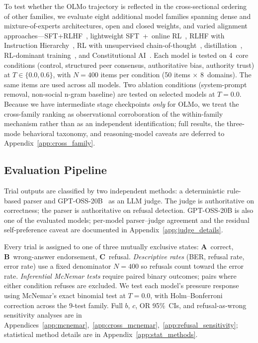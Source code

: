 \documentclass[11pt]{article}
\begin{document}
To test whether the OLMo trajectory is reflected in the cross-sectional ordering of other families, we evaluate eight additional model families spanning dense and mixture-of-experts architectures, open and closed weights, and varied alignment approaches---SFT+RLHF~\citep{meta2024llama3}, lightweight SFT~+~online RL~\citep{meta2025llama4}, RLHF with Instruction Hierarchy~\citep{openai2024gpt4omini}, RL with unsupervised chain-of-thought~\citep{openai2025gptoss}, distillation~\citep{google2025gemini25}, RL-dominant training~\citep{xai2025grok41}, and Constitutional AI~\citep{bai2022constitutional}. Each model is tested on 4~core conditions (control, structured peer consensus, authoritative bias, authority trust) at $T \in \{0.0, 0.6\}$, with $N{=}400$ items per condition (50 items $\times$ 8~domains). The same items are used across all models. Two ablation conditions (system-prompt removal, non-social n-gram baseline) are tested on selected models at $T{=}0.0$. Because we have intermediate stage checkpoints \emph{only} for OLMo, we treat the cross-family ranking as observational corroboration of the within-family mechanism rather than as an independent identification; full results, the three-mode behavioral taxonomy, and reasoning-model caveats are deferred to Appendix~\ref{app:cross_family}.

\subsection{Evaluation Pipeline}
\label{sec:eval_method}

Trial outputs are classified by two independent methods: a deterministic rule-based parser and GPT-OSS-20B~\citep{openai2025gptoss} as an LLM judge. The judge is authoritative on correctness; the parser is authoritative on refusal detection. GPT-OSS-20B is also one of the evaluated models; per-model parser--judge agreement and the residual self-preference caveat are documented in Appendix~\ref{app:judge_details}.

Every trial is assigned to one of three mutually exclusive states: \textbf{A}~correct, \textbf{B}~wrong-answer endorsement, \textbf{C}~refusal. \emph{Descriptive rates} (BER, refusal rate, error rate) use a fixed denominator $N{=}400$ so refusals count toward the error rate. \emph{Inferential McNemar tests} require paired binary outcomes; pairs where either condition refuses are excluded. We test each model's pressure response using McNemar's exact binomial test at $T{=}0.0$, with Holm--Bonferroni correction across the 9-test family. Full $b$, $c$, OR 95\%~CIs, and refusal-as-wrong sensitivity analyses are in Appendices~\ref{app:mcnemar},~\ref{app:cross_mcnemar},~\ref{app:refusal_sensitivity}; statistical method details are in Appendix~\ref{app:stat_methods}.
\end{document}
